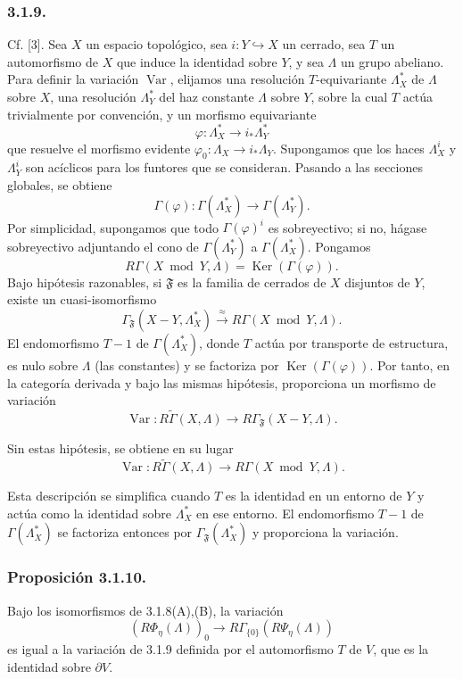 \subsubsection*{3.1.9.}
Cf. [3]. Sea $X$ un espacio topológico, sea $i:Y\hookrightarrow X$ un
cerrado, sea $T$ un automorfismo de $X$ que induce la identidad sobre
$Y$, y sea $\Lambda$ un grupo abeliano. Para definir la variación
$\operatorname{Var}$, elijamos una resolución $T$-equivariante
$\Lambda_X^*$ de $\Lambda$ sobre $X$, una resolución $\Lambda_Y^*$ del
haz constante $\Lambda$ sobre $Y$, sobre la cual $T$ actúa trivialmente
por convención, y un morfismo equivariante
\[
\varphi:\Lambda_X^*\longrightarrow i_*\Lambda_Y^*
\]
que resuelve el morfismo evidente
$\varphi_0:\Lambda_X\to i_*\Lambda_Y$. Supongamos que los haces
$\Lambda_X^i$ y $\Lambda_Y^i$ son acíclicos para los funtores que se
consideran. Pasando a las secciones globales, se obtiene
\[
\Gamma(\varphi):\Gamma(\Lambda_X^*)
\longrightarrow\Gamma(\Lambda_Y^*).
\]
Por simplicidad, supongamos que todo $\Gamma(\varphi)^i$ es sobreyectivo;
si no, hágase sobreyectivo adjuntando el cono de
$\Gamma(\Lambda_Y^*)$ a $\Gamma(\Lambda_X^*)$. Pongamos
\[
R\Gamma(X\bmod Y,\Lambda)=\operatorname{Ker}(\Gamma(\varphi)).
\]
Bajo hipótesis razonables, si $\mathfrak F$ es la familia de cerrados de
$X$ disjuntos de $Y$, existe un cuasi-isomorfismo
\[
\Gamma_{\mathfrak F}(X-Y,\Lambda_X^*)
\xrightarrow{\ \approx\ }R\Gamma(X\bmod Y,\Lambda).
\]
El endomorfismo $T-1$ de $\Gamma(\Lambda_X^*)$, donde $T$ actúa por
transporte de estructura, es nulo sobre $\Lambda$ (las constantes) y
se factoriza por $\operatorname{Ker}(\Gamma(\varphi))$. Por tanto, en la
categoría derivada y bajo las mismas hipótesis, proporciona un morfismo
de variación
\[
\operatorname{Var}:R\widetilde\Gamma(X,\Lambda)
\longrightarrow R\Gamma_{\mathfrak F}(X-Y,\Lambda).
\]

\pageoriginale

Sin estas hipótesis, se obtiene en su lugar
\[
\operatorname{Var}:R\widetilde\Gamma(X,\Lambda)
\longrightarrow R\Gamma(X\bmod Y,\Lambda).
\]

Esta descripción se simplifica cuando $T$ es la identidad en un entorno
de $Y$ y actúa como la identidad sobre $\Lambda_X^*$ en ese entorno. El
endomorfismo $T-1$ de $\Gamma(\Lambda_X^*)$ se factoriza entonces por
$\Gamma_{\mathfrak F}(\Lambda_X^*)$ y proporciona la variación.

\subsubsection*{Proposición 3.1.10.}
Bajo los isomorfismos de 3.1.8(A),(B), la variación
\[
(R\Phi_\eta(\Lambda))_0
\longrightarrow R\Gamma_{\{0\}}(R\Psi_\eta(\Lambda))
\]
es igual a la variación de 3.1.9 definida por el automorfismo $T$ de
$V$, que es la identidad sobre $\partial V$.

